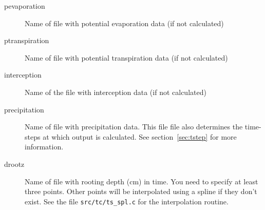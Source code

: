 \begin{description}
\item[pevaporation]
Name of file with potential evaporation data (if not calculated)

\item[ptranspiration]
Name of file with potential transpiration data (if not calculated)

\item[interception]
Name of the file with interception data (if not calculated)

\item[precipitation]
Name of file with precipitation data. This file file also determines
the time-steps at which output is calculated. See section~\ref{sec:tstep}
for more information.

\item[drootz]
Name of file with rooting depth (cm) in time. You need to specify at
least three points. Other points will be interpolated using a spline
if they don't exist. See the file {\tt src/tc/ts\_spl.c} for the
interpolation routine.
\end{description}


